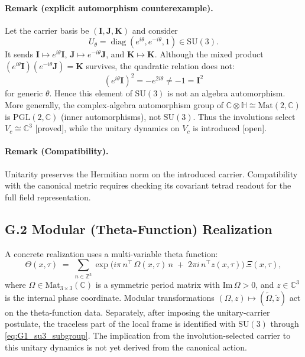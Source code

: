 \paragraph{Remark (explicit automorphism counterexample).}
Let the carrier basis be $(\mathbf{I},\mathbf{J},\mathbf{K})$ and consider
\[
U_\theta=\operatorname{diag}(e^{i\theta},e^{-i\theta},1)\in\mathrm{SU}(3).
\]
It sends $\mathbf{I}\mapsto e^{i\theta}\mathbf{I}$,
$\mathbf{J}\mapsto e^{-i\theta}\mathbf{J}$, and
$\mathbf{K}\mapsto\mathbf{K}$.  Although the mixed product
$(e^{i\theta}\mathbf{I})(e^{-i\theta}\mathbf{J})=\mathbf{K}$ survives,
the quadratic relation does not:
\[
(e^{i\theta}\mathbf{I})^2=-e^{2i\theta}\neq-1=\mathbf{I}^2
\]
for generic $\theta$.  Hence this element of $\mathrm{SU}(3)$ is not an
algebra automorphism.  More generally, the complex-algebra automorphism group
of $\mathbb{C}\otimes\mathbb{H}\cong\mathrm{Mat}(2,\mathbb{C})$ is
$\mathrm{PGL}(2,\mathbb{C})$ (inner automorphisms), not $\mathrm{SU}(3)$.
Thus the involutions select $V_c\cong\mathbb{C}^3$ [proved], while the unitary
dynamics on $V_c$ is introduced [open].

\paragraph{Remark (Compatibility).}
Unitarity preserves the Hermitian norm on the introduced carrier.
Compatibility with the canonical metric requires checking its covariant
tetrad readout for the full field representation.

\subsection*{G.2 Modular (Theta-Function) Realization}
A concrete realization uses a multi-variable theta function:
\begin{equation}
\label{eq:G2_multi_theta}
\Theta(x,\tau)\;=\;\sum_{n\in \mathbb{Z}^3}\exp\Big(i\pi\, n^{\!\top}\,\Omega(x,\tau)\,n \;+\; 2\pi i\, n^{\!\top} z(x,\tau)\Big)\, \Xi(x,\tau),
\end{equation}
where $\Omega\in \mathrm{Mat}_{3\times 3}(\mathbb{C})$ is a symmetric period matrix with 
$\mathrm{Im}\,\Omega>0$, and $z\in \mathbb{C}^3$ is the internal phase coordinate. 
Modular transformations $(\Omega,z)\mapsto (\tilde\Omega,\tilde z)$ act on the theta-function data.  Separately, after imposing the unitary-carrier postulate, the traceless part of the local frame is identified with $\mathrm{SU}(3)$ through \eqref{eq:G1_su3_subgroup}.  The implication from the involution-selected carrier to this unitary dynamics is not yet derived from the canonical action.

